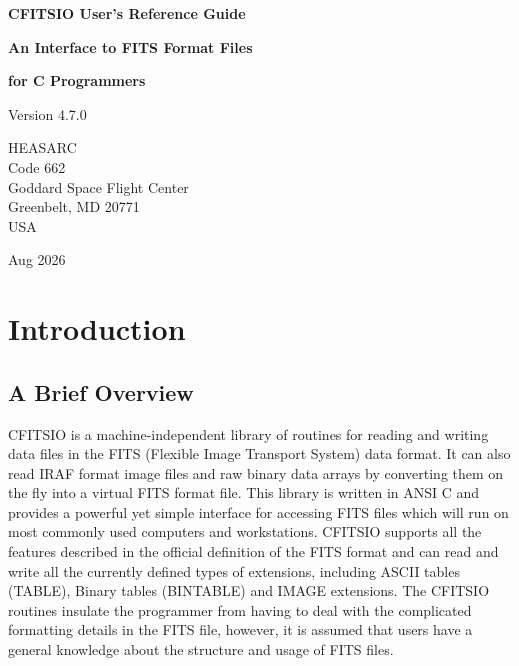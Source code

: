 \documentclass[11pt]{book}
\begin{document}

\begin{titlepage}
\normalsize
\vspace*{4.0cm}
\begin{center}
{\Huge \bf CFITSIO User's Reference Guide}\\
\end{center}
\medskip 
\medskip 
\begin{center}
{\LARGE \bf An Interface to FITS Format Files}\\
\end{center}
\begin{center}
{\LARGE \bf for C Programmers}\\
\end{center}
\medskip
\medskip
\begin{center}
{\Large Version 4.7.0\\}
\end{center}
\bigskip
\vskip 2.5cm
\begin{center}
{HEASARC\\
Code 662\\
Goddard Space Flight Center\\
Greenbelt, MD 20771\\
USA}
\end{center}

\vfill
\bigskip
\begin{center}
{\Large Aug 2026\\}
\end{center}
\vfill
\end{titlepage}

\clearpage

\tableofcontents
\chapter{Introduction }


\section{ A Brief Overview}

CFITSIO is a machine-independent library of routines for reading and
writing data files in the FITS (Flexible Image Transport System) data
format.  It can also read IRAF format image files and raw binary data
arrays by converting them on the fly into a virtual FITS format file.
This library is written in ANSI C and provides a powerful yet simple
interface for accessing FITS files which will run on most commonly used
computers and workstations.  CFITSIO supports all the features
described in the official definition of the FITS format and can
read and write all the currently defined types of extensions, including
ASCII tables (TABLE), Binary tables (BINTABLE) and IMAGE extensions.
The CFITSIO routines insulate the programmer from having to deal with
the complicated formatting details in the FITS file, however, it is
assumed that users have a general knowledge about the structure and
usage of FITS files.
\end{document}
